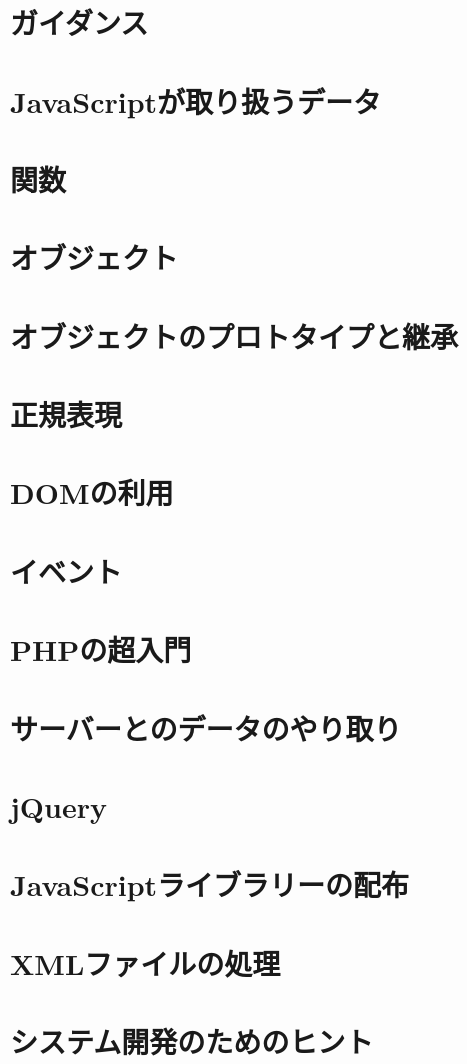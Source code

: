 
\Textfalse
\renewcommand{\postchaptername}{回}

\frontmatter
\maketitle
\tableofcontents
\mainmatter
\chapter{ガイダンス}

\chapter{JavaScriptが取り扱うデータ}






\chapter{関数}
\chapter{オブジェクト}
\chapter{オブジェクトのプロトタイプと継承}
\chapter{正規表現}
\chapter{DOMの利用}
\chapter{イベント}
\chapter{PHPの超入門}
\chapter{サーバーとのデータのやり取り}
\chapter{jQuery}
\chapter{JavaScriptライブラリーの配布}
\chapter{XMLファイルの処理}
\chapter{システム開発のためのヒント}
